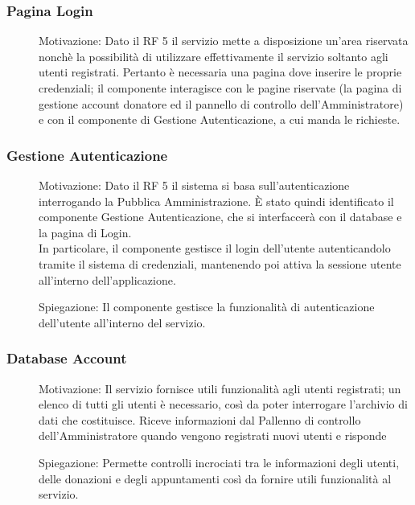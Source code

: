 \documentclass{article}
\begin{document}
\subsubsection{Pagina Login}
\begin{description}
	\item[] Motivazione: Dato il RF 5 il servizio mette a disposizione un'area riservata nonchè la possibilità di utilizzare effettivamente il servizio soltanto agli utenti registrati. Pertanto è necessaria una pagina dove inserire le proprie credenziali; il componente interagisce con le pagine riservate (la pagina di gestione account donatore ed il pannello di controllo dell'Amministratore) e con il componente di Gestione Autenticazione, a cui manda le richieste.
\end{description}

\subsubsection{Gestione Autenticazione}
\begin{description}
	\item[] Motivazione: Dato il RF 5 il sistema si basa sull'autenticazione interrogando la Pubblica Amministrazione. È stato quindi identificato il componente Gestione Autenticazione, che si interfaccerà con il database e la pagina di Login.\\In particolare, il componente gestisce il login dell'utente autenticandolo tramite il sistema di credenziali, mantenendo poi attiva la sessione utente all'interno dell'applicazione.
	\item[] Spiegazione: Il componente gestisce la funzionalità di autenticazione dell'utente all'interno del servizio.
\end{description}

\subsubsection{Database Account}
\begin{description}
	\item[] Motivazione: Il servizio fornisce utili funzionalità agli utenti registrati; un elenco di tutti gli utenti è necessario, così da poter interrogare l'archivio di dati che costituisce. Riceve informazioni dal Pallenno di controllo dell'Amministratore quando vengono registrati nuovi utenti e risponde 
	\item[] Spiegazione: Permette controlli incrociati tra le informazioni degli utenti, delle donazioni e degli appuntamenti così da fornire utili funzionalità al servizio.
\end{description}
\end{document}
